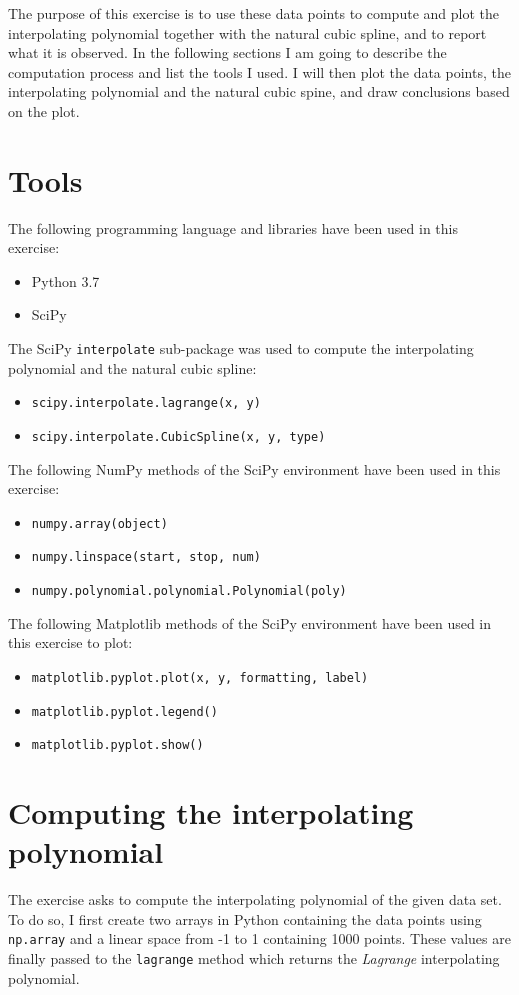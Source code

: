 \documentclass{article}
\newcommand{\code}{\texttt}
\begin{document}
The purpose of this exercise is to use these data points to compute and plot the interpolating polynomial together with the natural cubic spline, and to report what it is observed. In the following sections I am going to describe the computation process and list the tools I used. I will then plot the data points, the interpolating polynomial and the natural cubic spine, and draw conclusions based on the plot.

\section{Tools}
The following programming language and libraries have been used in this exercise:
\begin{itemize}
  \item Python 3.7
  \item SciPy
\end{itemize}
The SciPy \code{interpolate} sub-package was used to compute the interpolating polynomial and the natural cubic spline:
\begin{itemize}
  \item \code{scipy.interpolate.lagrange(x, y)}
  \item \code{scipy.interpolate.CubicSpline(x, y, type)}
\end{itemize}

The following NumPy methods of the SciPy environment have been used in this exercise:
\begin{itemize}
  \item \code{numpy.array(object)}
  \item \code{numpy.linspace(start, stop, num)}
  \item \code{numpy.polynomial.polynomial.Polynomial(poly)}
  \end{itemize}
The following Matplotlib methods of the SciPy environment have been used in this exercise to plot:
 \begin{itemize}
  \item \code{matplotlib.pyplot.plot(x, y, formatting, label)}
  \item \code{matplotlib.pyplot.legend()}
  \item \code{matplotlib.pyplot.show()}
  \end{itemize}
  
\section{Computing the interpolating polynomial}
The exercise asks to compute the interpolating polynomial of the given data set. To do so, I first create two arrays in Python containing the data points using \code{np.array} and a linear space from -1 to 1 containing 1000 points. These values are finally passed to the \code{lagrange} method which returns the {\it Lagrange} interpolating polynomial. \\
\end{document}
